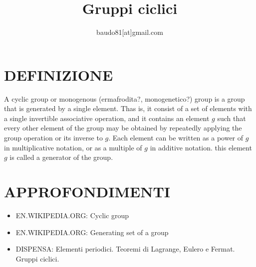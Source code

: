 \documentclass[a4paper,10pt]{article}
\title{Gruppi ciclici}
\author{baudo81[at]gmail.com}
\begin{document}
\maketitle

\section{DEFINIZIONE}
A cyclic group or monogenous (ermafrodita?, monogenetico?) group is a group that is generated by a single element. Thas is, it consist
of a set of elements with a single invertible associative operation, and it contains an element $g$ such that every other element
of the group may be obtained by repeatedly applying the group operation or its inverse to $g$. Each element can be written as a power
of $g$ in multiplicative notation, or as a multiple of $g$ in additive notation. this element $g$ is called a generator of the group. \cite{cyclicgroup1}

\section{APPROFONDIMENTI}
\begin{itemize}
 \item EN.WIKIPEDIA.ORG: Cyclic group \cite{cyclicgroup1}
 \item EN.WIKIPEDIA.ORG: Generating set of a group \cite{cyclicgroup2}
 \item DISPENSA: Elementi periodici. Teoremi di Lagrange, Eulero e Fermat. Gruppi ciclici. \cite{cyclicgroup3}
\end{itemize}



\end{document}
